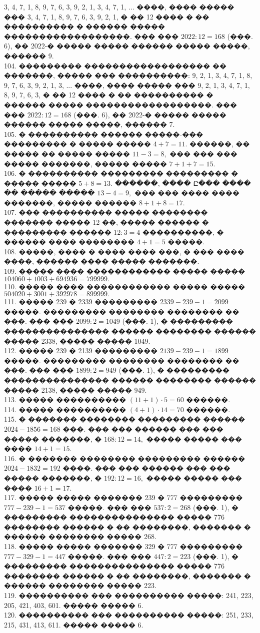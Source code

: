 \documentclass[12pt]{article}
\begin{document}
3, 4, 7, 1, 8, 9, 7, 6, 3, 9, 2, 1, 3, 4, 7, 1, ... ����, ���� ����� ���
3, 4, 7, 1, 8, 9, 7, 6, 3, 9, 2, 1, � �� 12 ���� � �� ���������� � ������ ����� ������������������. ��� ��� $2022:12=168$ (���. 6), �� 2022-� ����� ����� ������ ����� �����, ������ 9.\\
104. ��������� ������������������ �� �������, ����� ��� ����������:
9, 2, 1, 3, 4, 7, 1, 8, 9, 7, 6, 3, 9, 2, 1, 3, ... ����, ���� ����� ���
9, 2, 1, 3, 4, 7, 1, 8, 9, 7, 6, 3, � �� 12 ���� � �� ���������� � ������ ����� ������������������. ��� ��� $2022:12=168$ (���. 6), �� 2022-� ����� ����� ������ ����� �����, ������ 7.\\
105. � ���������� ������ �����-��� ��������� � ����� ����� $4+7=11.$ ������, �� ����� �� ����� ����� $11-3=8,$ ��� ��� ��� ����� �������, ����� ����� $7+1+7=15.$\\
106. � ���������� ��������� ��������� � ����� ����� $5+8=13.$ ������, ���� Ը��� ���� �� ����� ����� $13-4=9,$ ��� ��� ���� ���� �������, ����� ������ $8+1+8=17.$\\
107. ��� ���������� ����� �������� ������� ����� 12 ��, ����� ������ � ��������� ������ $12:3=4$ ����������, � ������ ���� �������� $4+1=5$ �����.\\
108. �����, ���� � ���� ���� ���, � ��� ���� ����, ������ ���� ����� �������.\\
109. ����� ���� ������������ ����� ����� $104060+1003+694936=799999.$\\
110. ����� ���� ������������ ����� ����� $504020+3001+392978=899999.$\\
111. ����� 239 � 2339 ��������� $2339-239-1=2099$ �����. ��������� �������� �������� �� ���. ��� ��� $2099:2=1049$ (���. 1), � ��������� ��������������� ������ �������� ������ ����� 2338, ����� ����� 1049.\\
112. ����� 239 � 2139 ��������� $2139-239-1=1899$ �����. ��������� �������� �������� �� ���. ��� ��� $1899:2=949$ (���. 1), � ��������� ��������������� ������ �������� ������ ����� 2138, ����� ����� 949.\\
113. ����� ���������� $(11+1)\cdot5=60$ ������.\\
114. ����� ���������� $(4+1)\cdot14=70$ ������.\\
115. � ������� �������� ��������� ������ $2024-1856=168$ ���. ��� ��� ������ ��� ��� ����� �������, � $168:12=14,$  ����� ����� ��� ���� $14+1=15.$\\
116. � ������� �������� ��������� ������ $2024-1832=192$ ����. ��� ��� ������ ��� ��� ����� �������, � $192:12=16,$  ����� ����� ��� ���� $16+1=17.$\\
117. ����� ����� ������� 239 � 777 ��������� $777-239-1=537$ �����. ��� ��� $537:2=268$ (���. 1), � ��������� ��������������� ����� 776 �������� ������ � �� ��������, ������� � ������ �������� ����� 268.\\
118. ����� ����� ������� 329 � 777 ��������� $777-329-1=447$ �����. ��� ��� $447:2=223$ (���. 1), � ��������� ��������������� ����� 776 �������� ������ � �� ��������, ������� � ������ �������� ����� 223.\\
119. ���������� ��� ���������� �����: 241, 223, 205, 421, 403, 601. ����� ����� 6.\\
120. ���������� ��� ���������� �����: 251, 233, 215, 431, 413, 611. ����� ����� 6.
\newpage
\end{document}
